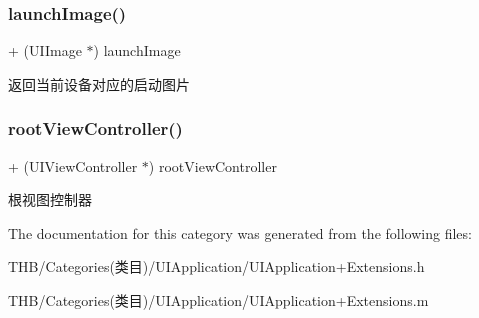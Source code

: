 \subsubsection{\texorpdfstring{launch\+Image()}{launchImage()}}
{\footnotesize\ttfamily + (U\+I\+Image $\ast$) launch\+Image \begin{DoxyParamCaption}{ }\end{DoxyParamCaption}}

返回当前设备对应的启动图片 \mbox{\label{category_u_i_application_07_extensions_08_a10d15b61c29815469619a2713ac7555d}} 
\subsubsection{\texorpdfstring{root\+View\+Controller()}{rootViewController()}}
{\footnotesize\ttfamily + (U\+I\+View\+Controller $\ast$) root\+View\+Controller \begin{DoxyParamCaption}{ }\end{DoxyParamCaption}}

根视图控制器 

The documentation for this category was generated from the following files\+:\begin{DoxyCompactItemize}
\item 
T\+H\+B/\+Categories(类目)/\+U\+I\+Application/U\+I\+Application+\+Extensions.\+h\item 
T\+H\+B/\+Categories(类目)/\+U\+I\+Application/U\+I\+Application+\+Extensions.\+m\end{DoxyCompactItemize}
